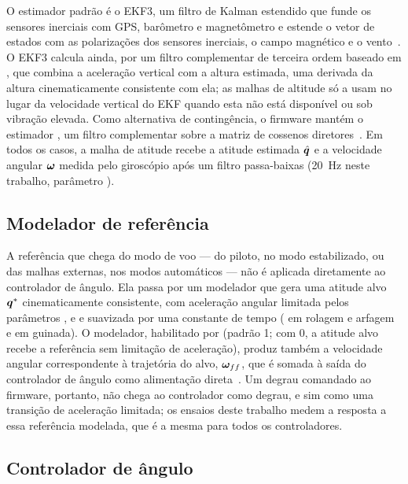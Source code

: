 O estimador padrão é o EKF3, um filtro de Kalman estendido que funde os
sensores inerciais com GPS, barômetro e magnetômetro e estende o vetor de
estados com as polarizações dos sensores inerciais, o campo magnético e o
vento~\cite{ardupilotdev,ardupilot2026}. O EKF3 calcula ainda, por um filtro
complementar de terceira ordem baseado em , que
combina a aceleração vertical com a altura estimada, uma derivada da altura
cinematicamente consistente com ela; as malhas de altitude só a usam no lugar
da velocidade vertical do EKF quando esta não está disponível ou sob vibração
elevada. Como alternativa de contingência, o firmware mantém o
estimador , um filtro complementar sobre a matriz de
cossenos diretores~\cite{premerlani2009}. Em todos os casos, a malha de
atitude recebe a atitude estimada $\hat{\bm{q}}$ e a velocidade angular
$\bm{\omega}$ medida pelo giroscópio após um filtro passa-baixas
(\SI{20}{\hertz} neste trabalho, parâmetro ).

\subsection{Modelador de referência}

A referência que chega do modo de voo --- do piloto, no modo estabilizado, ou
das malhas externas, nos modos automáticos --- não é aplicada diretamente ao
controlador de ângulo. Ela passa por um modelador que gera uma atitude alvo
$\bm{q}^*$ cinematicamente consistente, com aceleração angular limitada
pelos parâmetros ,  e
 e suavizada por uma constante de tempo
( em rolagem e arfagem e 
em guinada). O modelador, habilitado por  (padrão
1; com 0, a atitude alvo recebe a referência sem limitação de aceleração),
produz também a velocidade angular correspondente à trajetória do alvo,
$\bm{\omega}_{ff}$, que é somada à saída do controlador de ângulo como
alimentação direta~\cite{ardupilot2026}. Um degrau
comandado ao firmware, portanto, não chega ao controlador como degrau, e sim
como uma transição de aceleração limitada; os ensaios deste trabalho medem a
resposta a essa referência modelada, que é a mesma para todos os
controladores.

\subsection{Controlador de ângulo}

